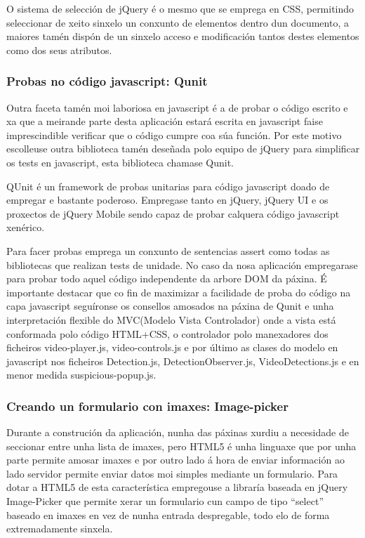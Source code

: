             O sistema de selección de jQuery é o mesmo que se emprega en CSS, permitindo seleccionar de 
            xeito sinxelo un conxunto de elementos dentro dun documento, a maiores tamén dispón de un 
            sinxelo acceso e modificación tantos destes elementos como dos seus atributos.
            
        \subsubsection{Probas no código javascript: Qunit}
        
            Outra faceta tamén moi laboriosa en javascript é a de probar o código escrito e xa que 
            a meirande parte desta aplicación estará escrita en javascript faise imprescindible 
            verificar que o código cumpre coa súa función. Por este motivo escolleuse outra 
            biblioteca tamén deseñada polo equipo de jQuery para simplificar os tests en javascript,
            esta biblioteca chamase Qunit.
            
            QUnit é un framework de probas unitarias para código javascript doado de empregar e bastante
            poderoso. Empregase tanto en jQuery, jQuery UI e os proxectos de jQuery Mobile sendo capaz 
            de probar calquera código javascript xenérico.
            
            Para facer probas emprega un conxunto de sentencias assert como todas as bibliotecas que 
            realizan tests de unidade. No caso da nosa aplicación empregarase para probar todo aquel
            código independente da arbore DOM da páxina. É importante destacar que co fin de maximizar
            a facilidade de proba do código na capa javascript seguíronse os consellos amosados na páxina
            de Qunit\cite{QunitMakeItTesteable} e unha interpretación flexible do MVC(Modelo 
            Vista Controlador) onde a vista está conformada polo código HTML+CSS, o controlador polo 
            manexadores dos ficheiros video-player.js, video-controls.js e por último as clases do 
            modelo en javascript nos ficheiros Detection.js, DetectionObserver.js, VideoDetections.js e 
            en menor medida suspicious-popup.js.
        
        \subsubsection{Creando un formulario con imaxes: Image-picker}
            Durante a construción da aplicación, nunha das páxinas xurdiu a necesidade de seccionar
            entre unha lista de imaxes, pero HTML5 é unha linguaxe que por unha parte permite
            amosar imaxes e por outro lado á hora de enviar información ao lado servidor permite 
            enviar datos moi simples mediante un formulario. Para dotar a HTML5 de esta 
            característica empregouse a libraría baseada en jQuery Image-Picker\cite{ImagePickerPage}
            que permite xerar un formulario cun campo de tipo ``select'' 
            baseado en imaxes en vez de nunha entrada despregable, todo elo de forma extremadamente
            sinxela.
        
